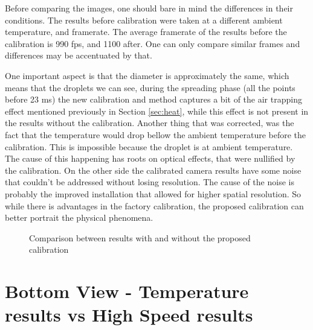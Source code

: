 \par Before comparing the images, one should bare in mind the differences in their conditions. The results before calibration were taken at a different ambient temperature, and framerate. The average framerate of the results before the calibration is 990 fps, and 1100 after. One can only compare similar frames and differences may be accentuated by that. \\
\par One important aspect is that the diameter is approximately the same, which means that the droplets we can see, during the spreading phase (all the points before 23 ms) the new calibration and method captures a bit of the air trapping effect mentioned previously in Section \ref{sec:heat}, while this effect is not present in the results without the calibration. Another thing that was corrected, was the fact that the temperature would drop bellow the ambient temperature before the calibration. This is impossible because the droplet is at ambient temperature. The cause of this happening has roots on optical effects, that were nullified by the calibration. On the other side the calibrated camera results have some noise that couldn't be addressed without losing resolution. The cause of the noise is probably the improved installation that allowed for higher spatial resolution. So while there is advantages in the factory calibration, the proposed calibration can better portrait the physical phenomena. \\

\begin{figure}
\centering


\caption{Comparison between results with and without the proposed calibration}
\label{fig:calibcomp2}
\end{figure}

\section{Bottom View - Temperature results vs High Speed results}

